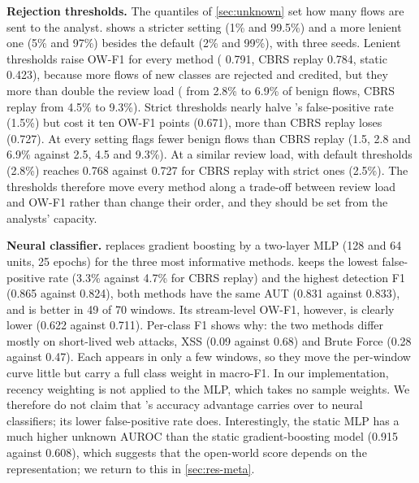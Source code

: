 \textbf{Rejection thresholds.} The quantiles of \cref{sec:unknown} set how many flows are sent to the analyst.
 shows a stricter setting (1\% and 99.5\%) and a more lenient one (5\% and 97\%) besides the
default (2\% and 99\%), with three seeds. Lenient thresholds raise OW-F1 for every method (\nova{} 0.791, CBRS
replay 0.784, static 0.423), because more flows of new classes are rejected and credited, but they more than double
the review load (\nova{} from 2.8\% to 6.9\% of benign flows, CBRS replay from 4.5\% to 9.3\%). Strict thresholds
nearly halve \nova{}'s false-positive rate (1.5\%) but cost it ten OW-F1 points (0.671), more than CBRS replay
loses (0.727). At every setting \nova{} flags fewer benign flows than CBRS replay (1.5, 2.8 and 6.9\% against 2.5,
4.5 and 9.3\%). At a similar review load, \nova{} with default thresholds (2.8\%) reaches 0.768 against 0.727 for
CBRS replay with strict ones (2.5\%). The thresholds therefore move every method along a trade-off between review
load and OW-F1 rather than change their order, and they should be set from the analysts' capacity.

\begin{table}[t]
\centering
\caption{Rejection thresholds on CIC-IDS2017 (budget 10\%): stricter = MSP 1\%, $k$-NN 99.5\%; default = 2\%,
99\%; more lenient = 5\%, 97\%. Mean over three seeds (default: the same three seeds of the main comparison);
FPR in \%.}
\label{tab:review}
\small
{}
\end{table}

\textbf{Neural classifier.}  replaces gradient boosting by a two-layer MLP (128 and 64 units, 25
epochs) for the three most informative methods. \nova{} keeps the lowest false-positive rate (3.3\% against 4.7\%
for CBRS replay) and the highest detection F1 (0.865 against 0.824), both methods have the same AUT (0.831 against
0.833), and \nova{} is better in 49 of 70 windows. Its stream-level OW-F1, however, is clearly lower (0.622 against
0.711). Per-class F1 shows why: the two methods differ mostly on short-lived web attacks, XSS (0.09 against 0.68)
and Brute Force (0.28 against 0.47). Each appears in only a few windows, so they move the per-window curve little but
carry a full class weight in macro-F1. In our implementation, recency weighting is not applied to the MLP, which
takes no sample weights. We therefore do not claim that \nova{}'s accuracy advantage carries over to neural
classifiers; its lower false-positive rate does. Interestingly, the static MLP has a much higher unknown AUROC
than the static gradient-boosting model (0.915 against 0.608), which suggests that the open-world score depends on
the representation; we return to this in \cref{sec:res-meta}.

